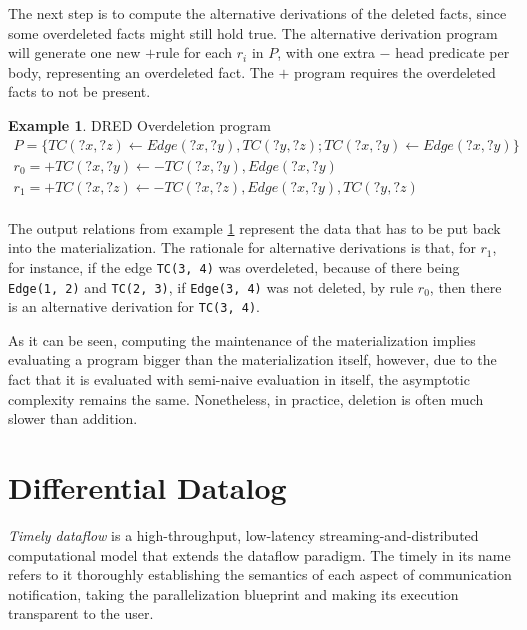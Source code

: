 \documentclass[sigconf,screen,review,natbib]{acmart}
\theoremstyle{definition}
\newtheorem{exmp}{Example}[section]
\begin{document}
The next step is to compute the alternative derivations of the deleted facts, since some overdeleted facts might still hold true. The alternative derivation program will generate one new $+$rule for each $r_i$ in $P$, with one extra $-$ head predicate per body, representing an overdeleted fact. The $+$ program requires the overdeleted facts to not be present.

\begin{exmp}{DRED Overdeletion program}
	\tiny
	\begin{align}
		P = \{ TC(?x, ?z) \leftarrow Edge(?x, ?y), TC(?y, ?z); TC(?x, ?y) \leftarrow Edge(?x, ?y) \} \nonumber                                                           \\
		r_0 = +TC(?x, ?y) \leftarrow -TC(?x, ?y), Edge(?x, ?y)                                                                                                           \\
		r_1 = +TC(?x, ?z) \leftarrow -TC(?x, ?z), Edge(?x, ?y), TC(?y, ?z)                                                                                     \nonumber \\
	\end{align}
	\label{ex7}
\end{exmp}

The output relations from example \ref{ex7} represent the data that has to be put back into the materialization. The rationale for alternative derivations is that, for $r_1$, for instance, if the edge \verb|TC(3, 4)| was overdeleted, because of there being \verb|Edge(1, 2)| and \verb|TC(2, 3)|, if \verb|Edge(3, 4)| was not deleted, by rule $r_0$, then there is an alternative derivation for \verb|TC(3, 4)|.

As it can be seen, computing the maintenance of the materialization implies evaluating a program bigger than the materialization itself, however, due to the fact that it is evaluated with semi-naive evaluation in itself, the asymptotic complexity remains the same\cite{complexity_of_dred}. Nonetheless, in practice, deletion is often much slower than addition.

\section{Differential Datalog}

\emph{Timely dataflow} is a high-throughput, low-latency
streaming-and-distributed computational model that extends the dataflow paradigm. The timely
in its name refers to it thoroughly establishing the semantics of each aspect of communication
notification, taking the parallelization blueprint and making its execution transparent to the user.
\end{document}
